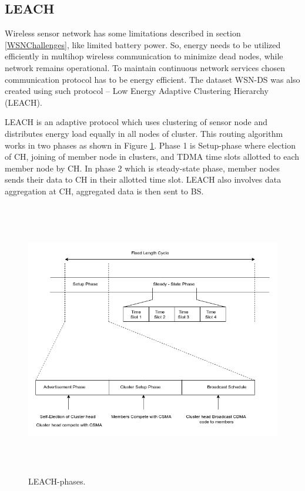     \subsection{LEACH} \label{SSLeach}
    Wireless sensor network has some limitations described in section \ref{WSNChallenges}, like limited battery power. So, energy needs to be utilized efficiently in multihop wireless communication to minimize dead nodes, while network remains operational. To maintain continuous network services chosen communication protocol has to be energy efficient. The dataset WSN-DS was also created using such protocol – Low Energy Adaptive Clustering Hierarchy (LEACH). 
    \par LEACH \cite{palan2017low} is an adaptive protocol which uses clustering of sensor node and distributes energy load equally in all nodes of cluster. This routing algorithm works in two phases as shown in Figure \ref{LeachPhases}. Phase 1 is Setup-phase where election of CH, joining of member node in clusters, and TDMA time slots allotted to each member node by CH. In phase 2 which is steady-state phase, member nodes sends their data to CH in their allotted time slot. LEACH also involves data aggregation at CH, aggregated data is then sent to BS.
    \begin{figure}[htb]
    \center	
    \includegraphics[width=5.5in, height=4.75in] {Figures/PNG/LeachPhases.png}
    \caption{LEACH-phases.}
    \label{LeachPhases}	
    \end{figure}
    
